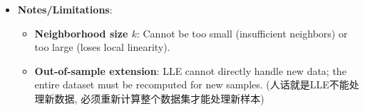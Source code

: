 \documentclass[UTF8]{ctexart}
\begin{document}
\begin{itemize}
    The cost function is equivalent to $\text{trace}(\mathbf{Z}(\mathbf{I}-\mathbf{W})(\mathbf{I}-\mathbf{W})^\top \mathbf{Z}^\top)$. $\mathbf{Z}$ is composed of the $d$ eigenvectors of $(\mathbf{I}-\mathbf{W})(\mathbf{I}-\mathbf{W})^\top$ corresponding to the \textbf{smallest $d$ non-zero eigenvalues}.\\
    (z 由$(\mathbf{I} - \mathbf{W})(\mathbf{I} - \mathbf{W}^\top)$的最小的d个非零特征值对应的特征向量组成)
    \item \textbf{Notes/Limitations}:
    \begin{itemize}
        \item \textbf{Neighborhood size $k$}: Cannot be too small (insufficient neighbors) or too large (loses local linearity).
        \item \textbf{Out-of-sample extension}: LLE cannot directly handle new data; the entire dataset must be recomputed for new samples.
        (人话就是LLE不能处理新数据, 必须重新计算整个数据集才能处理新样本)
    \end{itemize}
\end{itemize}
\end{document}
